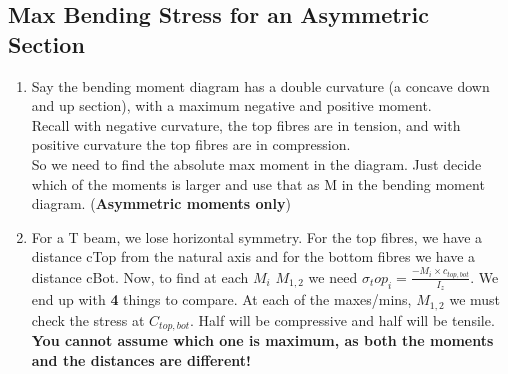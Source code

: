 \documentclass[10pt, twocolumn]{report}
\begin{document}
\subsection{Max Bending Stress for an Asymmetric Section}
\begin{enumerate}
  \item Say the bending moment diagram has a double curvature (a concave down and up section), with a maximum negative and positive moment. \\ Recall with negative curvature, the top fibres are in tension, and with positive curvature the top fibres are in compression. \\ So we need to find the absolute max moment in the diagram. Just decide which of the moments is larger and use that as M in the bending moment diagram. (\textbf{Asymmetric moments only})
  \item For a T beam, we lose horizontal symmetry.  For the top fibres, we have a distance cTop from the natural axis and for the bottom fibres we have a distance cBot. Now, to find at each $M_i$ $M_{1,2}$ we need $\sigma_top_i = \frac{-M_i \times c_{top, bot}}{I_z}$. We end up with \textbf{4} things to compare. At each of the maxes/mins, $M_{1,2}$ we must check the stress at $C_{top, bot}$. Half will be compressive and half will be tensile. \textbf{You cannot assume which one is maximum, as both the moments and the distances are different!}
\end{enumerate}
\end{document}
